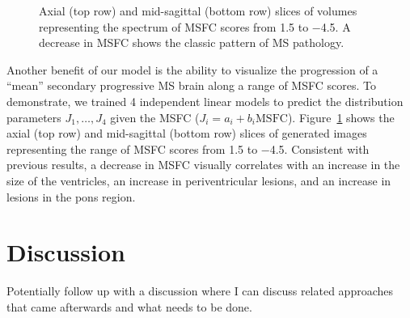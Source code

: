 \begin{figure}[tb]
\centering
{}
\caption{Axial (top row) and mid-sagittal (bottom row) slices of volumes
representing the spectrum of MSFC scores from \num{1.5} to \num{-4.5}. A
decrease in MSFC shows the classic pattern of MS pathology.}
\label{fig:msspectrum}
\end{figure}

Another benefit of our model is the ability to visualize the progression of a
``mean'' secondary progressive MS brain along a range of MSFC scores.
To demonstrate, we trained 4 independent linear models to predict the
distribution parameters $J_1, \dotsc, J_4$ given the MSFC ($J_i = a_i +
b_i\text{MSFC}$). Figure~\ref{fig:msspectrum} shows the axial (top row) and
mid-sagittal (bottom row) slices of generated images representing the range of
MSFC scores from \num{1.5} to \num{-4.5}. Consistent with previous results, a
decrease in MSFC visually correlates with an increase in the size of the
ventricles, an increase in periventricular lesions, and an increase in lesions
in the pons region.

\section{Discussion}

Potentially follow up with a discussion where I can discuss related approaches
that came afterwards and what needs to be done.

